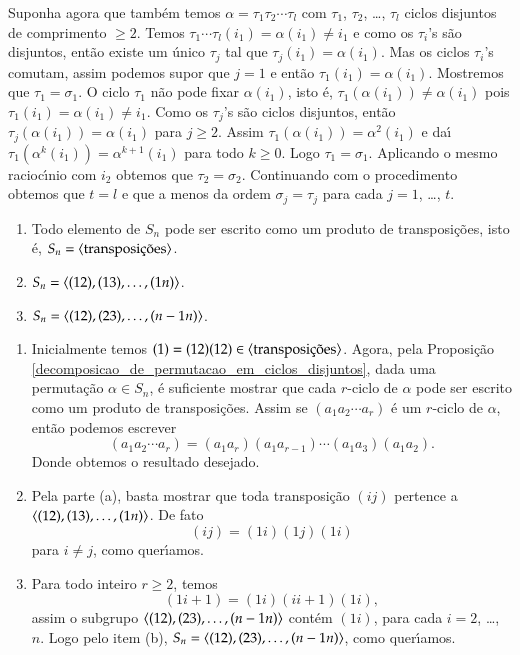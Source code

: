 \begin{prova}
	Suponha agora que tamb\'em temos $\alpha = \tau_1\tau_2\cdots \tau_l$ com $\tau_1$, $\tau_2$, \dots, $\tau_l$ ciclos disjuntos de comprimento $\ge 2$. Temos $\tau_1\cdots \tau_l(i_1) = \alpha(i_1) \ne i_1$ e como os $\tau_i$'s s\~ao disjuntos, ent\~ao existe um \'unico $\tau_j$ tal que $\tau_j(i_1) = \alpha(i_1)$. Mas os ciclos $\tau_i$'s comutam, assim podemos supor que $j = 1$ e ent\~ao $\tau_1(i_1) = \alpha(i_1)$. Mostremos que $\tau_1 = \sigma_1$. O ciclo $\tau_1$ n\~ao pode fixar $\alpha(i_1)$, isto \'e, $\tau_1(\alpha(i_1)) \ne \alpha(i_1)$ pois $\tau_1(i_1) = \alpha(i_1) \ne i_1$. Como os $\tau_j$'s s\~ao ciclos disjuntos, ent\~ao $\tau_j(\alpha(i_1)) = \alpha(i_1)$ para $j \ge 2$. Assim $\tau_1(\alpha(i_1)) = \alpha^2(i_1)$ e da{\'\i} $\tau_1(\alpha^k(i_1)) = \alpha^{k + 1}(i_1)$ para todo $k \ge 0$. Logo $\tau_1 = \sigma_1$. Aplicando o mesmo racioc{\'\i}nio com $i_2$ obtemos que $\tau_2 = \sigma_2$. Continuando com o procedimento obtemos que $t = l$ e que a menos da ordem $\sigma_j = \tau_j$ para cada $j = 1$, \dots, $t$.
\end{prova}

\begin{proposicao}
	\begin{enumerate}
		\item Todo elemento de $S_n$ pode ser escrito como um produto de transposi\c{c}\~oes, isto \'e, $S_n = \ger{\mbox{transposi\c{c}\~oes}}$.

		\item $S_n = \langle{(12), (13), \dots, (1n)}\rangle$.

		\item $S_n = \langle{(12), (23), \dots, (n-1 n)}\rangle$.
	\end{enumerate}
\end{proposicao}
\begin{prova}
	\begin{enumerate}
		\item Inicialmente temos $(1) = (12)(12) \in \ger{\mbox{transposi\c{c}\~oes}}$. Agora, pela Proposi\c{c}\~ao \ref{decomposicao_de_permutacao_em_ciclos_disjuntos}, dada uma permuta\c{c}\~ao $\alpha \in S_n$, \'e suficiente mostrar que cada $r$-ciclo de $\alpha$ pode ser escrito como um produto de transposi\c{c}\~oes. Assim se $(a_1 a_2 \cdots a_r)$ \'e um $r$-ciclo de $\alpha$, ent\~ao podemos escrever
		\[
			(a_1 a_2 \cdots a_r) = (a_1 a_r)(a_1 a_{r - 1})\cdots (a_1 a_3)(a_1 a_2).
		\]
		Donde obtemos o resultado desejado.

		\item Pela parte (a), basta mostrar que toda transposi\c{c}\~ao $(i j)$ pertence a $\langle{(12), (13), \dots, (1n)}\rangle$. De fato
		\[
			(i j) = (1 i)(1 j)(1 i)
		\]
		para $i \ne j$, como quer{\'\i}amos.

		\item Para todo inteiro $r \ge 2$, temos
		\[
			(1 i+1) = (1 i)(i i+1)(1 i),
		\]
		assim o subgrupo $\langle{(12), (23), \dots, (n-1 n)}\rangle$ cont\'em $(1 i)$, para cada $i = 2$, \dots, $n$. Logo pelo item (b), $S_n = \langle{(12), (23), \dots, (n-1 n)}\rangle$, como quer{\'\i}amos.
	\end{enumerate}
\end{prova}

